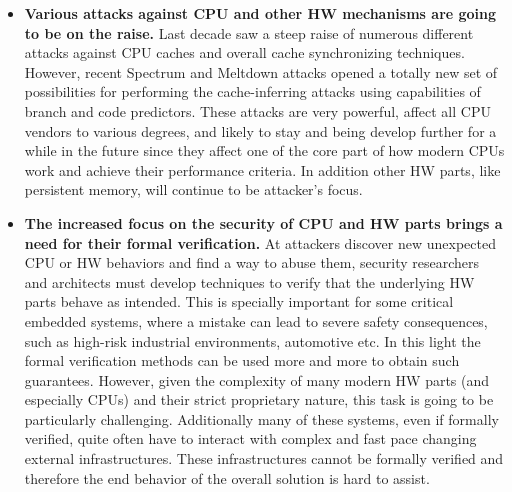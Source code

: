\begin{itemize}
	\item \textbf{Various attacks against CPU and other HW mechanisms are going to be on the raise.} Last decade saw a steep raise of numerous different attacks against CPU caches and overall cache synchronizing techniques. However, recent Spectrum and Meltdown attacks opened a totally new set of possibilities for performing the cache-inferring attacks using capabilities of branch and code predictors. These attacks are very powerful, affect all CPU vendors to various degrees, and likely to stay and being develop further for a while in the future since they affect one of the core part of how modern CPUs work and achieve their performance criteria. In addition other HW parts, like persistent memory, will continue to be attacker's focus. 		
		\item \textbf{The increased focus on the security of CPU and HW parts brings a need for their formal verification.} At attackers discover new unexpected CPU or HW behaviors and find a way to abuse them, security researchers and architects must develop techniques to verify that the underlying HW parts behave as intended. This is specially important for some critical embedded systems, where a mistake can lead to severe safety consequences, such as high-risk industrial environments, automotive etc. In this light the formal verification methods can be used more and more to obtain such guarantees. However, given the complexity of many modern HW parts (and especially CPUs) and their strict proprietary nature, this task is going to be particularly challenging. Additionally many of these systems, even if formally verified, quite often have to interact with complex and fast pace changing external infrastructures. These infrastructures cannot be formally verified and therefore the end behavior of the overall solution is hard to assist.  	
		\end{itemize}
